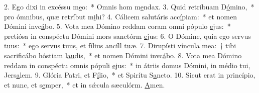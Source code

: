 2. Ego dixi in excéssu m\uline{e}o:~* Omnis hom m\uline{e}ndax.
3. Quid retríbuam D\uline{ó}mino,~* pro ómnibus, quæ retríbut m\uline{i}hi?
4. Cálicem salutáris acc\uline{í}piam:~* et nomen Dómini invc\uline{á}bo.
5. Vota mea Dómino reddam coram omni pópulo \uline{e}jus:~* pretiósa in conspéctu Dómini mors sanctórm \uline{e}jus:
6. O Dómine, quia ego servus t\uline{u}us:~* ego servus tuus, et fílius ancíll t\uline{u}æ.
7. Dirupísti víncula mea:~† tibi sacrificábo hóstiam l\uline{au}dis,~* et nomen Dómini invc\uline{á}bo.
8. Vota mea Dómino reddam in conspéctu omnis pópuli \uline{e}jus:~* in átriis domus Dómini, in médio tui, Jers\uline{a}lem.
9. Glória Patri, et F\uline{í}lio,~* et Spirítu S\uline{a}ncto.
10. Sicut erat in princípio, et nunc, et s\uline{e}mper,~* et in sǽcula sæculórm. \uline{A}men.

